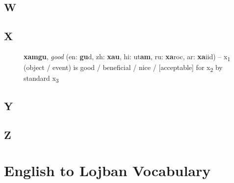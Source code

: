 \documentclass[12pt]{book}
\begin{document}
\begin{description}
\item[ ]
\end{description}

\subsection{W} %

\begin{description}
\item[ ]
\end{description}

\subsection{X} %

\begin{description}
\item[ ] \textbf{xamgu}, \textit{good} (en: \textbf{gu}d, zh: \textbf{xau}, hi: ut\textbf{am}, ru: \textbf{xa}roc, ar: \textbf{xa}iid) -- x\textsubscript{1} (object / event) is good / beneficial / nice / [acceptable] for x\textsubscript{2} by standard x\textsubscript{3}
\end{description}

\subsection{Y} %

\begin{description}
\item[ ]
\end{description}

\subsection{Z} %

\begin{description}
\item[ ]
\end{description}



\section{English to Lojban Vocabulary}
\end{document}
